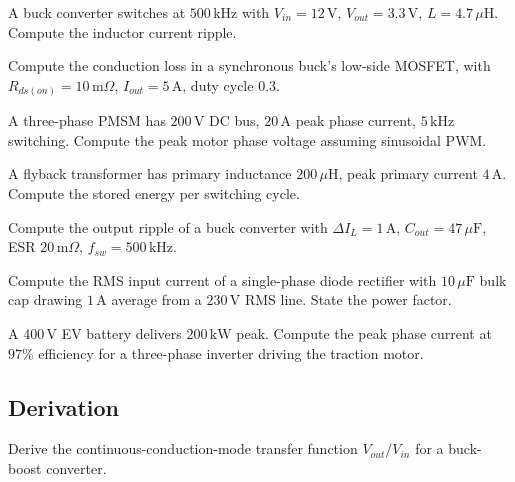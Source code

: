 \begin{exercise}
A buck converter switches at $500\,\text{kHz}$ with $V_{in} = 12\,\text{V}$, $V_{out} = 3.3\,\text{V}$, $L = 4.7\,\mu\text{H}$. Compute the inductor current ripple.
\end{exercise}

\begin{exercise}
Compute the conduction loss in a synchronous buck's low-side MOSFET, with $R_{ds(on)} = 10\,\text{m}\Omega$, $I_{out} = 5\,\text{A}$, duty cycle $0.3$.
\end{exercise}

\begin{exercise}
A three-phase PMSM has $200\,\text{V}$ DC bus, $20\,\text{A}$ peak phase current, $5\,\text{kHz}$ switching. Compute the peak motor phase voltage assuming sinusoidal PWM.
\end{exercise}

\begin{exercise}
A flyback transformer has primary inductance $200\,\mu\text{H}$, peak primary current $4\,\text{A}$. Compute the stored energy per switching cycle.
\end{exercise}

\begin{exercise}
Compute the output ripple of a buck converter with $\Delta I_L = 1\,\text{A}$, $C_{out} = 47\,\mu\text{F}$, ESR $20\,\text{m}\Omega$, $f_{sw} = 500\,\text{kHz}$.
\end{exercise}

\begin{exercise}
Compute the RMS input current of a single-phase diode rectifier with $10\,\mu\text{F}$ bulk cap drawing $1\,\text{A}$ average from a $230\,\text{V}$ RMS line. State the power factor.
\end{exercise}

\begin{exercise}
A $400\,\text{V}$ EV battery delivers $200\,\text{kW}$ peak. Compute the peak phase current at $97\%$ efficiency for a three-phase inverter driving the traction motor.
\end{exercise}

\subsection*{Derivation}

\begin{exercise}
Derive the continuous-conduction-mode transfer function $V_{out}/V_{in}$ for a buck-boost converter.
\end{exercise}

